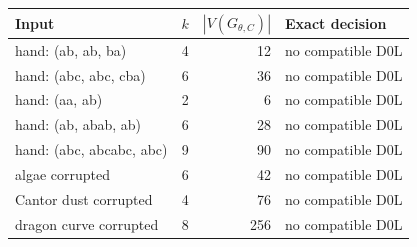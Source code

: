 \begin{tabular}{lrrl}
\toprule
Input & $k$ & $|V(G_{\theta,C})|$ & Exact decision \\
\midrule
hand: (ab, ab, ba) & 4 & 12 & no compatible D0L \\
hand: (abc, abc, cba) & 6 & 36 & no compatible D0L \\
hand: (aa, ab) & 2 & 6 & no compatible D0L \\
hand: (ab, abab, ab) & 6 & 28 & no compatible D0L \\
hand: (abc, abcabc, abc) & 9 & 90 & no compatible D0L \\
algae corrupted & 6 & 42 & no compatible D0L \\
Cantor dust corrupted & 4 & 76 & no compatible D0L \\
dragon curve corrupted & 8 & 256 & no compatible D0L \\
\bottomrule
\end{tabular}
